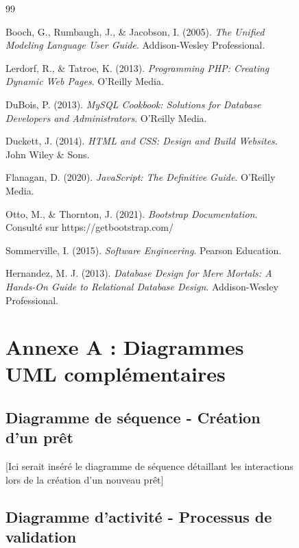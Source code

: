 \documentclass[12pt,a4paper]{report}
\begin{document}
\begin{figure}[H]
\newpage

\begin{thebibliography}{99}

Booch, G., Rumbaugh, J., \& Jacobson, I. (2005). 
\textit{The Unified Modeling Language User Guide}. 
Addison-Wesley Professional.

Lerdorf, R., \& Tatroe, K. (2013). 
\textit{Programming PHP: Creating Dynamic Web Pages}. 
O'Reilly Media.

DuBois, P. (2013). 
\textit{MySQL Cookbook: Solutions for Database Developers and Administrators}. 
O'Reilly Media.

Duckett, J. (2014). 
\textit{HTML and CSS: Design and Build Websites}. 
John Wiley \& Sons.

Flanagan, D. (2020). 
\textit{JavaScript: The Definitive Guide}. 
O'Reilly Media.

Otto, M., \& Thornton, J. (2021). 
\textit{Bootstrap Documentation}. 
Consulté sur https://getbootstrap.com/

Sommerville, I. (2015). 
\textit{Software Engineering}. 
Pearson Education.

Hernandez, M. J. (2013). 
\textit{Database Design for Mere Mortals: A Hands-On Guide to Relational Database Design}. 
Addison-Wesley Professional.

\end{thebibliography}

\newpage

\appendix

\chapter{Annexe A : Diagrammes UML complémentaires}

\section{Diagramme de séquence - Création d'un prêt}

[Ici serait inséré le diagramme de séquence détaillant les interactions lors de la création d'un nouveau prêt]

\section{Diagramme d'activité - Processus de validation}


\end{figure}
\end{document}
